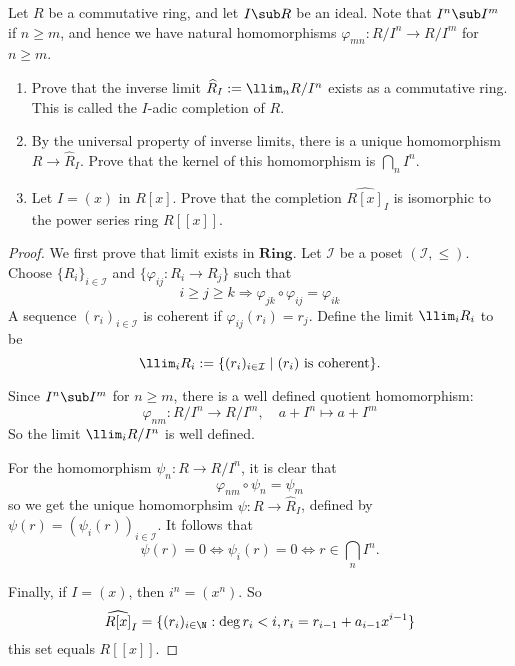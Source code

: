 \begin{exercise}\label{adic comple}
Let $R$ be a commutative ring, and let $I\sub R$ be an ideal. Note that $I^n\sub I^m$ if $n\geq m$, and hence we have natural homomorphisms $\varphi_{mn}:R/I^n\to R/I^m$ for $n\geq m$.
\begin{enumerate}
\item Prove that the inverse limit $\widehat{R}_I:=\llim_nR/I^n$ exists as a commutative ring. This
is called the $I$-adic completion of $R$.
\item By the universal property of inverse limits, there is a unique homomorphism $R\to\widehat{R}_I$. Prove that the kernel of this homomorphism is $\bigcap_nI^n$.
\item Let $I=(x)$ in $R[x]$. Prove that the completion $\widehat{R[x]}_I$ is isomorphic to the power series ring $R[[x]]$.
\end{enumerate}
\end{exercise}
\begin{proof}
We first prove that limit exists in $\mathbf{Ring}$. Let $\mathcal{I}$ be a poset $(\mathcal{I},\leq)$. Choose $\{R_i\}_{i\in\mathcal{I}}$ and $\{\varphi_{ij}:R_i\to R_j\}$ such that
\[i\geq j\geq k\Rightarrow\varphi_{jk}\circ\varphi_{ij}=\varphi_{ik}\]
A sequence $(r_i)_{i\in\mathcal{I}}$ is coherent if $\varphi_{ij}(r_i)=r_j$. Define the limit $\llim_{i}R_i$ to be
\[\llim_iR_i:=\{(r_i)_{i\in\mathcal{I}}\mid (r_i)\text{ is coherent}\}.\]

Since $I^n\sub I^m$ for $n\geq m$, there is a well defined quotient homomorphism:
\[\varphi_{nm}:R/I^n\to R/I^m,\quad a+I^n\mapsto a+I^m\]
So the limit $\llim_iR/I^n$ is well defined.\par
For the homomorphism $\psi_n:R\to R/I^n$, it is clear that
\[\varphi_{nm}\circ\psi_n=\psi_m\]
so we get the unique homomorphsim $\psi:R\to\widehat{R}_I$, defined by $\psi(r)=(\psi_i(r))_{i\in\mathcal{I}}$. It follows that
\[\psi(r)=0\iff \psi_i(r)=0\iff r\in\bigcap_nI^n.\]

Finally, if $I=(x)$, then $i^n=(x^n)$. So 
\[\widehat{R[x]}_I=\{(r_i)_{i\in\N}:\deg r_i<i,r_i=r_{i-1}+a_{i-1}x^{i-1}\}\]
this set equals $R[[x]]$.
\end{proof}
